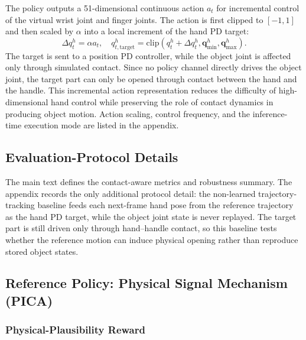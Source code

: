 The policy outputs a 51-dimensional continuous action $a_t$ for
incremental control of the virtual wrist joint and finger joints.
The action is first clipped to $[-1,1]$ and then scaled by $\alpha$
into a local increment of the hand PD target:
\begin{equation}
\Delta q_t^h = \alpha a_t,\quad
q_{t,\mathrm{target}}^h =
\mathrm{clip}(q_t^h+\Delta q_t^h,
\mathbf{q}_{\min}^h,\mathbf{q}_{\max}^h).
\label{eq:action}
\end{equation}
The target is sent to a position PD controller, while the object
joint is affected only through simulated contact. Since no policy
channel directly drives the object joint, the target part can only be
opened through contact between the hand and the handle. This incremental
action representation reduces the difficulty of high-dimensional
hand control while preserving the role of contact dynamics in
producing object motion. Action scaling, control frequency, and the
inference-time execution mode are listed in the appendix.


\subsection{Evaluation-Protocol Details}
\label{sec:protocol}

The main text defines the contact-aware metrics and robustness
summary. The appendix records the only additional protocol detail:
the non-learned trajectory-tracking baseline feeds each next-frame
hand pose from the reference trajectory as the hand PD target, while
the object joint state is never replayed. The target part is still
driven only through hand--handle contact, so this baseline tests
whether the reference motion can induce physical opening rather than
reproduce stored object states.

\subsection{Reference Policy: Physical Signal Mechanism (PICA)}
\label{sec:pica_app}

\subsubsection{Physical-Plausibility Reward}
\label{sec:reward}

